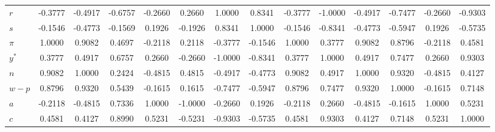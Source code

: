 \begin{center}
\begin{longtable}{lccccccccccccc}
$r          $	 & 	     -0.3777	 & 	     -0.4917	 & 	     -0.6757	 & 	     -0.2660	 & 	      0.2660	 & 	      1.0000	 & 	      0.8341	 & 	     -0.3777	 & 	     -1.0000	 & 	     -0.4917	 & 	     -0.7477	 & 	     -0.2660	 & 	     -0.9303 \\ 
$s          $	 & 	     -0.1546	 & 	     -0.4773	 & 	     -0.1569	 & 	      0.1926	 & 	     -0.1926	 & 	      0.8341	 & 	      1.0000	 & 	     -0.1546	 & 	     -0.8341	 & 	     -0.4773	 & 	     -0.5947	 & 	      0.1926	 & 	     -0.5735 \\ 
${\pi}      $	 & 	      1.0000	 & 	      0.9082	 & 	      0.4697	 & 	     -0.2118	 & 	      0.2118	 & 	     -0.3777	 & 	     -0.1546	 & 	      1.0000	 & 	      0.3777	 & 	      0.9082	 & 	      0.8796	 & 	     -0.2118	 & 	      0.4581 \\ 
${y^*}      $	 & 	      0.3777	 & 	      0.4917	 & 	      0.6757	 & 	      0.2660	 & 	     -0.2660	 & 	     -1.0000	 & 	     -0.8341	 & 	      0.3777	 & 	      1.0000	 & 	      0.4917	 & 	      0.7477	 & 	      0.2660	 & 	      0.9303 \\ 
${n}        $	 & 	      0.9082	 & 	      1.0000	 & 	      0.2424	 & 	     -0.4815	 & 	      0.4815	 & 	     -0.4917	 & 	     -0.4773	 & 	      0.9082	 & 	      0.4917	 & 	      1.0000	 & 	      0.9320	 & 	     -0.4815	 & 	      0.4127 \\ 
${w-p}      $	 & 	      0.8796	 & 	      0.9320	 & 	      0.5439	 & 	     -0.1615	 & 	      0.1615	 & 	     -0.7477	 & 	     -0.5947	 & 	      0.8796	 & 	      0.7477	 & 	      0.9320	 & 	      1.0000	 & 	     -0.1615	 & 	      0.7148 \\ 
$a          $	 & 	     -0.2118	 & 	     -0.4815	 & 	      0.7336	 & 	      1.0000	 & 	     -1.0000	 & 	     -0.2660	 & 	      0.1926	 & 	     -0.2118	 & 	      0.2660	 & 	     -0.4815	 & 	     -0.1615	 & 	      1.0000	 & 	      0.5231 \\ 
$c          $	 & 	      0.4581	 & 	      0.4127	 & 	      0.8990	 & 	      0.5231	 & 	     -0.5231	 & 	     -0.9303	 & 	     -0.5735	 & 	      0.4581	 & 	      0.9303	 & 	      0.4127	 & 	      0.7148	 & 	      0.5231	 & 	      1.0000 \\ 
\end{longtable}
 \end{center}
